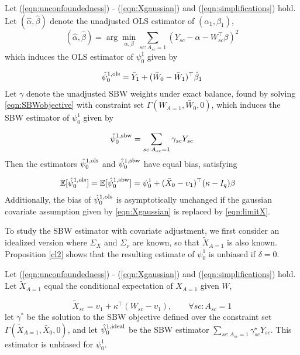 \begin{proposition}\label{cl1}
Let (\ref{eqn:unconfoundedness}) - (\ref{eqn:Xgaussian}) and (\ref{eqn:simplifications}) hold.
Let $(\hat{\alpha}, \hat{\beta})$ denote the unadjusted OLS estimator of $(\alpha_1, \beta_1)$, 
\begin{equation}\label{eqn:prop1.beta}
(\hat{\alpha}, \hat{\beta}) = \arg \min_{\alpha, \beta} \sum_{sc:A_{sc}=1} (Y_{sc} - \alpha -  W_{sc}^\top\beta)^2
\end{equation}
which induces the OLS estimator of $\psi_0^1$ given by

\begin{align*}
\hat{\psi}^{1,\textup{ols}}_0 = \bar{Y}_1 + (\bar{W}_0 - \bar{W}_1)^\top\hat{\beta}_1
\end{align*}
%
Let ${\gamma}$ denote the unadjusted SBW weights under exact balance, found by solving \eqref{eqn:SBWobjective} with constraint set $\Gamma( W_{A=1}, \bar{W}_0, 0)$, which induces the SBW estimator of $\psi_0^1$ given by

\begin{align*}
\hat{\psi}^{1,\textup{sbw}}_0 = \sum_{sc: A_{sc} = 1} {\gamma}_{sc} Y_{sc}
\end{align*}
%
Then the estimators $\hat{\psi}^{1, \textup{ols}}_0$ and $\hat{\psi}^{1, \textup{sbw}}_0$ have equal bias, satisfying

\begin{align*}
\mathbb{E}[\hat{\psi}_0^{1,\textup{ols}}] &= \mathbb{E}[\hat{\psi}^{1, \textup{sbw}}_0]  = \psi_0^1 + (\bar{X}_0 - \upsilon_1)^\top(\mathbf{\kappa} - I_q)\beta
\end{align*}
Additionally, the bias of $\hat{\psi}_0^{1,\textup{ols}}$ is asymptotically unchanged if the gaussian covariate assumption given by \eqref{eqn:Xgaussian} is replaced by \eqref{eqn:limitX}.
\end{proposition}

To study the SBW estimator with covariate adjustment, we first consider an idealized version where $\Sigma_X$ and $\Sigma_\nu$ are known, so that $\tilde{X}_{A=1}$ is also known. Proposition \ref{cl2} shows that the resulting estimate of $\psi_0^1$ is unbiased if $\delta = 0$.

\begin{proposition}\label{cl2}
Let (\ref{eqn:unconfoundedness}) - (\ref{eqn:Xgaussian}) and (\ref{eqn:simplifications}) hold. Let $\tilde{X}_{A=1}$ equal the conditional expectation of $X_{A=1}$ given $W$,

\[ \tilde{X}_{sc} = \upsilon_1 + \kappa^\top (W_{sc} - \upsilon_1), \qquad \forall sc: A_{sc} = 1\] let $\gamma^*$ be the solution to the SBW objective defined over the constraint set $\Gamma(\tilde{X}_{A=1}, \bar{X}_0, 0)$, and let $\hat{\psi}^{1, \textup{ideal}}_0$ be the SBW estimator $\sum_{sc: A_{sc} = 1}\gamma^\star_{sc}Y_{sc}$. This estimator is unbiased for $\psi_0^1$.
\end{proposition}


